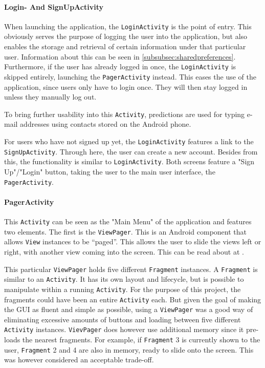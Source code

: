\paragraph{Login- And SignUpActivity}
When launching the application, the \texttt{LoginActivity} is the point of entry. This obviously serves the purpose of logging the user into the application, but also enables the storage and retrieval of certain information under that particular user. Information about this can be seen in \ref{subsubsec:sharedpreferences}. Furthermore, if the user has already logged in once, the \texttt{LoginActivity} is skipped entirely, launching the \texttt{PagerActivity} instead. This eases the use of the application, since users only have to login once. They will then stay logged in unless they manually log out.

To bring further usability into this \texttt{Activity}, predictions are used for typing e-mail addresses using contacts stored on the Android phone.

For users who have not signed up yet, the \texttt{LoginActivity} features a link to the \texttt{SignUpActivity}. Through here, the user can create a new account. Besides from this, the functionality is similar to \texttt{LoginActivity}. Both screens feature a "Sign Up"/"Login" button, taking the user to the main user interface, the \texttt{PagerActivity}.

\paragraph{PagerActivity}
This \texttt{Activity} can be seen as the "Main Menu" of the application and features two elements. The first is the \texttt{ViewPager}. This is an Android component that allows \texttt{View} instances to be ``paged''. This allows the user to slide the views left or right, with another view coming into the screen. This can be read about at \citep{viewpager}.

This particular \texttt{ViewPager} holds five different \texttt{Fragment} instances. A \texttt{Fragment} is similar to an \texttt{Activity}. It has its own layout and lifecycle, but is possible to manipulate within a running \texttt{Activity}.\citep{fragment} For the purpose of this project, the fragments could have been an entire \texttt{Activity} each. But given the goal of making the GUI as fluent and simple as possible, using a \texttt{ViewPager} was a good way of eliminating excessive amounts of buttons and loading between five different \texttt{Activity} instances. \texttt{VievPager} does however use additional memory since it pre-loads the nearest fragments. For example, if \texttt{Fragment} 3 is currently shown to the user, \texttt{Fragment} 2 and 4 are also in memory, ready to slide onto the screen. This was however considered an acceptable trade-off.

